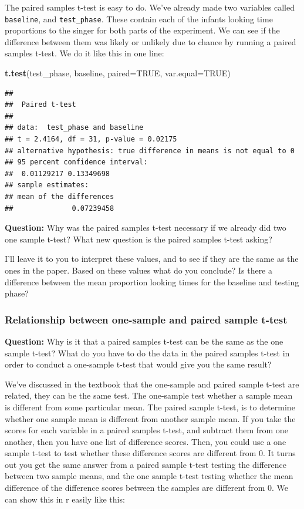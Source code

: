 \documentclass[]{book}
\newenvironment{Shaded}{\begin{snugshade}}{\end{snugshade}}
\newcommand{\KeywordTok}[1]{\textcolor[rgb]{0.13,0.29,0.53}{\textbf{#1}}}
\newcommand{\DataTypeTok}[1]{\textcolor[rgb]{0.13,0.29,0.53}{#1}}
\newcommand{\OtherTok}[1]{\textcolor[rgb]{0.56,0.35,0.01}{#1}}
\newcommand{\NormalTok}[1]{#1}
\begin{document}
The paired samples t-test is easy to do. We've already made two
variables called \texttt{baseline}, and \texttt{test\_phase}. These
contain each of the infants looking time proportions to the singer for
both parts of the experiment. We can see if the difference between them
was likely or unlikely due to chance by running a paired samples t-test.
We do it like this in one line:

\begin{Shaded}
\begin{Highlighting}[]
\KeywordTok{t.test}\NormalTok{(test_phase, baseline, }\DataTypeTok{paired=}\OtherTok{TRUE}\NormalTok{, }\DataTypeTok{var.equal=}\OtherTok{TRUE}\NormalTok{)}
\end{Highlighting}
\end{Shaded}

\begin{verbatim}
## 
##  Paired t-test
## 
## data:  test_phase and baseline
## t = 2.4164, df = 31, p-value = 0.02175
## alternative hypothesis: true difference in means is not equal to 0
## 95 percent confidence interval:
##  0.01129217 0.13349698
## sample estimates:
## mean of the differences 
##              0.07239458
\end{verbatim}

\textbf{Question:} Why was the paired samples t-test necessary if we
already did two one sample t-test? What new question is the paired
samples t-test asking?

I'll leave it to you to interpret these values, and to see if they are
the same as the ones in the paper. Based on these values what do you
conclude? Is there a difference between the mean proportion looking
times for the baseline and testing phase?

\subsubsection{Relationship between one-sample and paired sample
t-test}\label{relationship-between-one-sample-and-paired-sample-t-test}

\textbf{Question:} Why is it that a paired samples t-test can be the
same as the one sample t-test? What do you have to do the data in the
paired samples t-test in order to conduct a one-sample t-test that would
give you the same result?

We've discussed in the textbook that the one-sample and paired sample
t-test are related, they can be the same test. The one-sample test
whether a sample mean is different from some particular mean. The paired
sample t-test, is to determine whether one sample mean is different from
another sample mean. If you take the scores for each variable in a
paired samples t-test, and subtract them from one another, then you have
one list of difference scores. Then, you could use a one sample t-test
to test whether these difference scores are different from 0. It turns
out you get the same answer from a paired sample t-test testing the
difference between two sample means, and the one sample t-test testing
whether the mean difference of the difference scores between the samples
are different from 0. We can show this in r easily like this:
\end{document}
